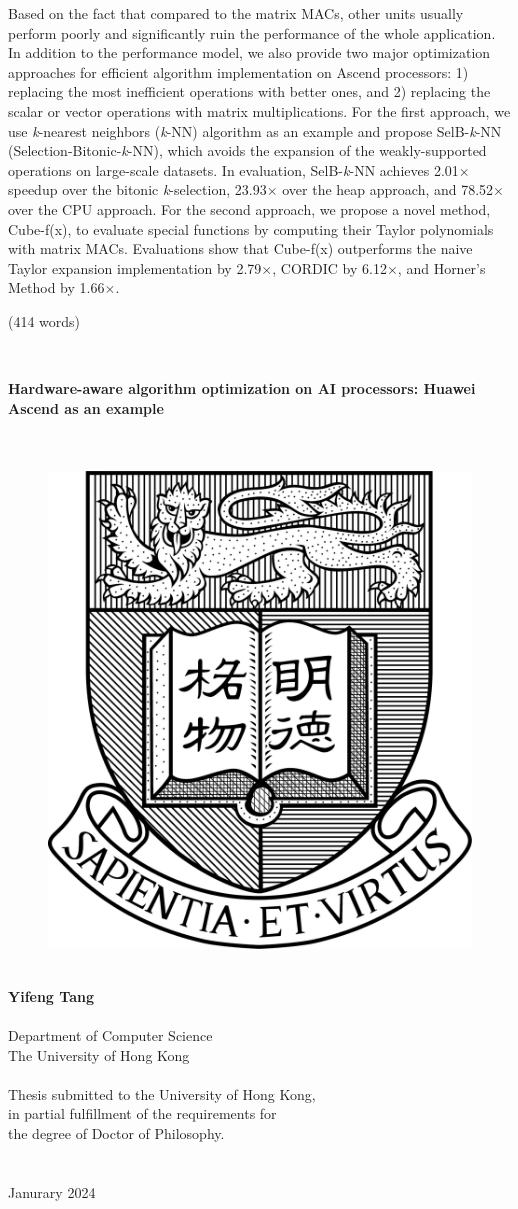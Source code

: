 \documentclass[12pt]{extbook}
\begin{document}
Based on the fact that compared to the matrix MACs, other units usually perform poorly and significantly ruin the performance of the whole application.
In addition to the performance model, we also provide two major optimization approaches for efficient algorithm implementation on Ascend processors: 1) replacing the most inefficient operations with better ones, and 2) replacing the scalar or vector operations with matrix multiplications. For the first approach, we use \textit{k}-nearest neighbors (\textit{k}-NN) algorithm as an example and propose SelB-\textit{k}-NN (Selection-Bitonic-\textit{k}-NN), which avoids the expansion of the weakly-supported operations on large-scale datasets. In evaluation, SelB-\textit{k}-NN achieves 2.01$\times$ speedup over the bitonic \textit{k}-selection, 23.93$\times$ over the heap approach, and 78.52$\times$ over the CPU approach. For the second approach, we propose a novel method, Cube-f(x), to evaluate special functions by computing their Taylor polynomials with matrix MACs. Evaluations show that Cube-f(x) outperforms the naive Taylor expansion implementation by 2.79$\times$, CORDIC by 6.12$\times$, and Horner's Method by 1.66$\times$.

(414 words)

\newpage
\thispagestyle{empty}
~


\newpage
\thispagestyle{empty}
\centering

{\Large \bf 
    Hardware-aware algorithm optimization on AI processors: Huawei Ascend as an example
}\\
~\\
~\\
\begin{figure}[htbp]
    \centering
    \includegraphics[width=5 cm]{fig/logo}
    \label{fig:logo}
\end{figure}
~\\
{\bf \large Yifeng Tang}\\
~\\
Department of Computer Science\\
The University of Hong Kong\\
~\\
Thesis submitted to the University of Hong Kong,\\
in partial fulfillment of the requirements for\\
the degree of Doctor of Philosophy.\\
~\\
~\\
Janurary 2024\\
\end{document}
